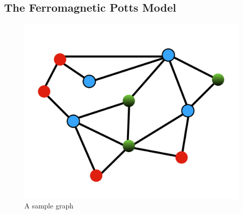 \documentclass{article}
\begin{document}
\subsection{The Ferromagnetic Potts Model}

\begin{figure}[h]
\centering
\includegraphics[scale=0.8]{media/sample-graph.png}
\caption{A sample graph}
\label{fig:sample-graph}
\end{figure}

\newpage

\end{document}
